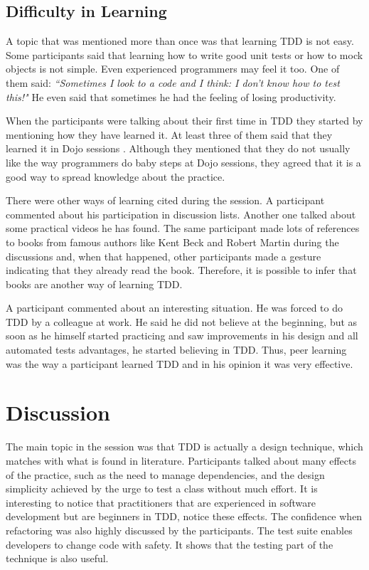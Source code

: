 \subsection{Difficulty in Learning}

A topic that was mentioned more than once was that learning TDD is not easy.
Some participants said that learning how to write good unit tests or how to
mock objects is not simple. Even experienced programmers may feel it too.
One of them said: \textit{``Sometimes I look to a code and I think: I don't know
how to test this!"} He even said that sometimes he had the feeling of losing
productivity.

When the participants were talking about their first time in TDD they started by
mentioning how they have learned it. At least three of them said that they
learned it in Dojo sessions \cite{dojo}. Although they mentioned that they do not usually
like the way programmers do baby steps at Dojo sessions, they agreed that it is
a good way to spread knowledge about the practice.

There were other ways of learning cited during the session. A participant
commented about his participation in discussion lists. Another one talked about
some practical videos he has found. The same participant made lots of references
to books from famous authors like Kent Beck and Robert Martin during the
discussions and, when that happened, other participants made a gesture
indicating that they already read the book. Therefore, it is possible to infer
that books are another way of learning TDD.

A participant commented about an interesting situation. He was forced to do TDD
by a colleague at work. He said he did not believe at the beginning, but as soon
as he himself started practicing and saw improvements in his design and all
automated tests advantages, he started believing in TDD. Thus, peer learning
was the way a participant learned TDD and in his opinion it was very effective.

\section{Discussion}

The main topic in the session was that TDD is actually a design technique,
which matches with what is found in literature. Participants talked about many
effects of the practice, such as the need to manage dependencies, and the design
simplicity achieved by the urge to test a class without much effort. It is
interesting to notice that practitioners that are experienced in software
development but are beginners in TDD, notice these effects. 
The confidence when refactoring was also highly discussed by the participants.
The test suite enables developers to change code with safety. It shows that the
testing part of the technique is also useful.

